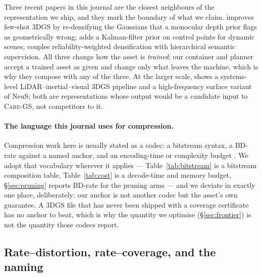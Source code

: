 \documentclass[preprint,number,3p]{elsarticle}
\newcommand{\care}{\textsc{Care-GS}}
\begin{document}
Three recent papers in this journal are the closest neighbours of the representation we ship, and they mark the
boundary of what we claim. \cite{jvcir-deptherror} improves few-shot 3DGS by re-densifying the Gaussians that a
monocular depth prior flags as geometrically wrong; \cite{jvcir-kfgs} adds a Kalman-filter prior on control points for
dynamic scenes; \cite{jvcir-rdsgs} couples reliability-weighted densification with hierarchical semantic
supervision. All three change how the asset is \emph{trained}; our container and planner accept a trained asset as
given and change only what leaves the machine, which is why they compose with any of the three. At the larger scale,
\cite{jvcir-liwgs} shows a systems-level LiDAR--inertial--visual 3DGS pipeline and \cite{jvcir-freneus} a
high-frequency surface variant of NeuS; both are representations whose output would be a candidate input to
\care{}, not competitors to it.

\paragraph{The language this journal uses for compression.} Compression work here is usually stated as a codec: a
bitstream syntax, a BD-rate against a named anchor, and an encoding-time or complexity budget
\cite{jvcir-gpcc,jvcir-vpccmtt,jvcir-vpcccplx,jvcir-mdllpcc}. We adopt that vocabulary wherever it applies ---
Table~\ref{tab:bitstream} is a bitstream composition table, Table~\ref{tab:cost} is a decode-time and memory budget,
\S\ref{sec:pruning} reports BD-rate for the pruning arms --- and we deviate in exactly one place, deliberately: our
anchor is not another codec but the asset's own guarantee. A 3DGS file that has never been shipped with a coverage
certificate has no anchor to beat, which is why the quantity we optimise (\S\ref{sec:frontier}) is not the quantity
those codecs report.

\subsection{Rate--distortion, rate--coverage, and the naming}
\label{sec:rw-rr}
\end{document}
